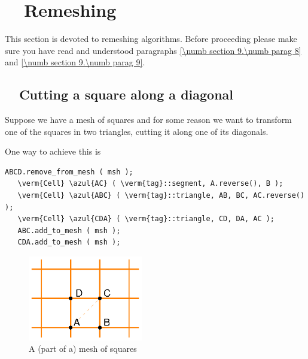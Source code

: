 
\chapter{~~Remeshing}\label{\numb section 10}

This section is devoted to remeshing algorithms.
Before proceeding please make sure you have read and understood paragraphs
\ref{\numb section 9.\numb parag 8} and \ref{\numb section 9.\numb parag 9}.


\section{~~Cutting a square along a diagonal}\label{\numb section 10.\numb parag 1}

Suppose we have a mesh of squares and for some reason we want to transform one of the
squares in two triangles, cutting it along one of its diagonals.

One way to achieve this is

\begin{Verbatim}[commandchars=\\\{\},formatcom=\small\tt,frame=single,
   label=main-\ref{\numb section 10.\numb parag 1}.cpp,rulecolor=\color{coment},
   baselinestretch=0.94,framesep=2mm]
   ABCD.remove_from_mesh ( msh );
   \verm{Cell} \azul{AC} ( \verm{tag}::segment, A.reverse(), B );
   \verm{Cell} \azul{ABC} ( \verm{tag}::triangle, AB, BC, AC.reverse() );
   \verm{Cell} \azul{CDA} ( \verm{tag}::triangle, CD, DA, AC );
   ABC.add_to_mesh ( msh );
   CDA.add_to_mesh ( msh );
\end{Verbatim}

\begin{figure}[ht] \centering
  \includegraphics[width=50mm]{malha-quadr}
  \caption{A (part of a) mesh of squares}
  \label{\numb section 10.\numb fig 1}
\end{figure}

